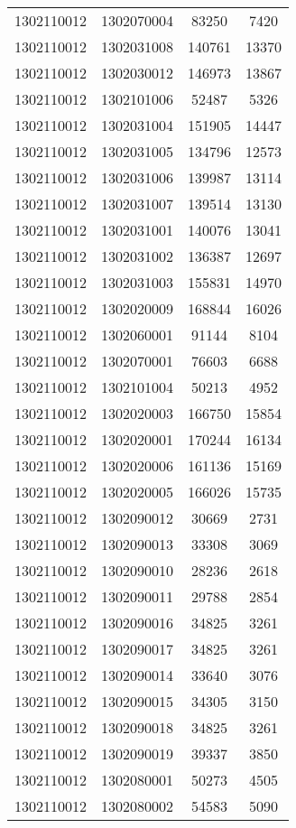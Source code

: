 \begin{longtable}[h]{llcc}
		1302110012 & 1302070004 & 83250 & 7420\\
		1302110012 & 1302031008 & 140761 & 13370\\
		1302110012 & 1302030012 & 146973 & 13867\\
		1302110012 & 1302101006 & 52487 & 5326\\
		1302110012 & 1302031004 & 151905 & 14447\\
		1302110012 & 1302031005 & 134796 & 12573\\
		1302110012 & 1302031006 & 139987 & 13114\\
		1302110012 & 1302031007 & 139514 & 13130\\
		1302110012 & 1302031001 & 140076 & 13041\\
		1302110012 & 1302031002 & 136387 & 12697\\
		1302110012 & 1302031003 & 155831 & 14970\\
		1302110012 & 1302020009 & 168844 & 16026\\
		1302110012 & 1302060001 & 91144 & 8104\\
		1302110012 & 1302070001 & 76603 & 6688\\
		1302110012 & 1302101004 & 50213 & 4952\\
		1302110012 & 1302020003 & 166750 & 15854\\
		1302110012 & 1302020001 & 170244 & 16134\\
		1302110012 & 1302020006 & 161136 & 15169\\
		1302110012 & 1302020005 & 166026 & 15735\\
		1302110012 & 1302090012 & 30669 & 2731\\
		1302110012 & 1302090013 & 33308 & 3069\\
		1302110012 & 1302090010 & 28236 & 2618\\
		1302110012 & 1302090011 & 29788 & 2854\\
		1302110012 & 1302090016 & 34825 & 3261\\
		1302110012 & 1302090017 & 34825 & 3261\\
		1302110012 & 1302090014 & 33640 & 3076\\
		1302110012 & 1302090015 & 34305 & 3150\\
		1302110012 & 1302090018 & 34825 & 3261\\
		1302110012 & 1302090019 & 39337 & 3850\\
		1302110012 & 1302080001 & 50273 & 4505\\
		1302110012 & 1302080002 & 54583 & 5090\\

\end{longtable}
